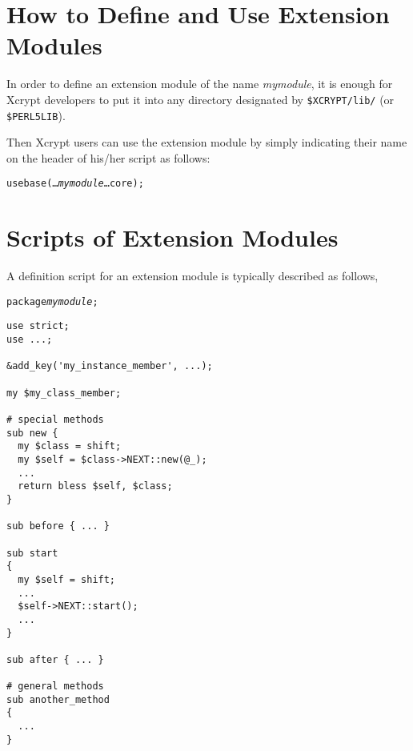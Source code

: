\documentclass[a4paper,10pt]{report}
\def\|{\verb|} %|
\begin{document}
\section{How to Define and Use Extension Modules}

In order to define an extension module of the name \textit{mymodule},
it is enough for Xcrypt developers to put it into any directory
designated by \|$XCRYPT/lib/| (or \|$PERL5LIB|).

Then Xcrypt users can use the extension module by simply indicating
their name on the header of his/her script as follows:
\begin{screen}
\begin{alltt}
use base (\ldots {\it mymodule} \ldots core);
\end{alltt}
\end{screen}


\section{Scripts of Extension Modules}

A definition script for an extension module is typically described as follows,
\begin{boxnote}
  \begin{alltt}
package {\it mymodule};
  \end{alltt}
\begin{verbatim}
use strict;
use ...;

&add_key('my_instance_member', ...);

my $my_class_member;

# special methods
sub new {
  my $class = shift;
  my $self = $class->NEXT::new(@_);
  ... 
  return bless $self, $class;
}

sub before { ... }

sub start
{
  my $self = shift;
  ...
  $self->NEXT::start();
  ...
}

sub after { ... }

# general methods
sub another_method
{
  ...
}
\end{verbatim}
\end{boxnote}
\vspace{\baselineskip}
\end{document}
